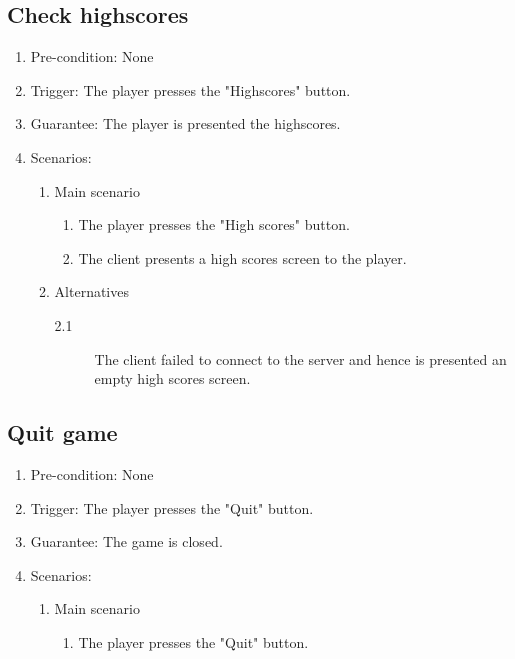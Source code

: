 \documentclass[a4paper,twoside,11pt]{article}
\begin{document}
\subsection*{Check highscores}
\begin{enumerate}
\item Pre-condition: None 
\item Trigger: The player presses the "Highscores" button.
\item Guarantee: The player is presented the highscores.
\item Scenarios: 
	\begin{enumerate}
	\item Main scenario
		\begin{enumerate}[1)]
		\item The player presses the "High scores" button.
		\item The client presents a high scores screen to the player.
		\end{enumerate}
	\item Alternatives
		\begin{description}
		\item[2.1] The client failed to connect to the server and hence 		is presented an empty high scores screen.
		\end{description}
	\end{enumerate}
\end{enumerate}
\subsection*{Quit game}
\begin{enumerate}
\item Pre-condition: None
\item Trigger: The player presses the "Quit" button.
\item Guarantee: The game is closed.
\item Scenarios: 
	\begin{enumerate}
	\item Main scenario
		\begin{enumerate}[1)]
		\item The player presses the "Quit" button.
		\end{enumerate}
	\end{enumerate}
\end{enumerate}
\end{document}

